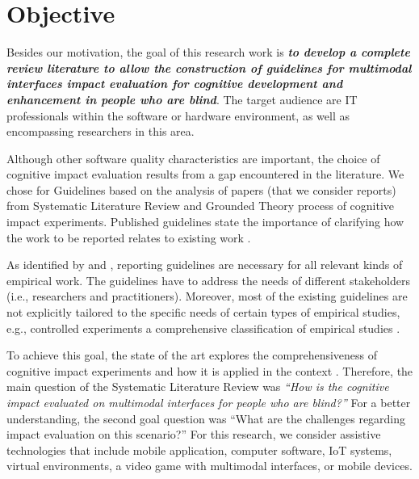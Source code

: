 \section{Objective}
\label{sec:introduction-objective}


Besides our motivation, the goal of this research work is \emph{\textbf{to develop a complete review literature to allow the construction of guidelines for multimodal interfaces impact evaluation for cognitive development and enhancement in people who are blind}}. The target audience are IT professionals within the software or hardware environment, as well as encompassing researchers in this area.

Although other software quality characteristics are important, the choice of cognitive impact evaluation results from a gap encountered in the literature. We chose for Guidelines based on the analysis of papers (that we consider reports) from Systematic Literature Review and Grounded Theory process of cognitive impact experiments. Published guidelines state the importance of clarifying how the work to be reported relates to existing work \cite{Jedlitschka2007}. 

As identified by  and , reporting guidelines are necessary for all relevant kinds of empirical work. The guidelines have to address the needs of different stakeholders (i.e., researchers and practitioners). Moreover, most of the existing guidelines are not explicitly tailored to the specific needs of certain types of empirical studies, e.g., controlled experiments a comprehensive classification of empirical studies \cite{Vinson2008AHumans}. 

To achieve this goal, the state of the art explores the comprehensiveness of cognitive impact experiments and how it is applied in the context . Therefore, the main question of the Systematic Literature Review was \emph{``How is the cognitive impact evaluated on multimodal interfaces for people who are blind?''} For a better understanding, the second goal question was ``What are the challenges regarding impact evaluation on this scenario?'' For this research, we consider assistive technologies that include mobile application, computer software, IoT systems, virtual environments, a video game with multimodal interfaces, or mobile devices.

